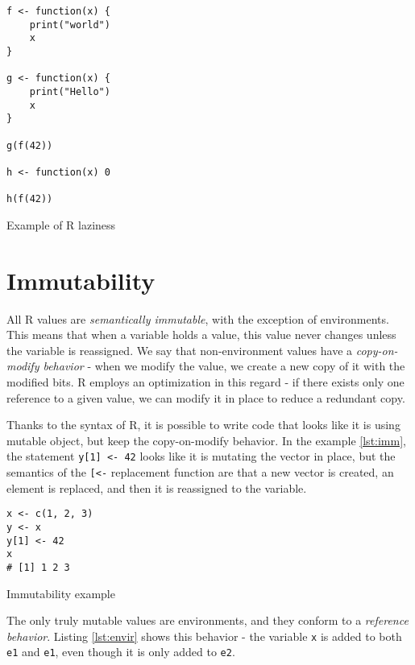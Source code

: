 \begin{listing}[h!]
	\centering
	\begin{verbatim}
f <- function(x) {
    print("world")
    x
}

g <- function(x) {
    print("Hello")
    x
}

g(f(42))

h <- function(x) 0

h(f(42))
  \end{verbatim}
	\caption{Example of R laziness}\label{lst:example-lazy}
\end{listing}

\section{Immutability}

All R values are \textit{semantically immutable}, with the exception of environments. This means that when a variable holds a value, this value never changes unless the variable is reassigned. We say that non-environment values have a \textit{copy-on-modify behavior} - when we modify the value, we create a new copy of it with the modified bits. R employs an optimization in this regard - if there exists only one reference to a given value, we can modify it in place to reduce a redundant copy.

Thanks to the syntax of R, it is possible to write code that looks like it is using mutable object, but keep the copy-on-modify behavior. In the example \ref{lst:imm}, the statement \texttt{y[1] <- 42} looks like it is mutating the vector in place, but the semantics of the \texttt{[<-} replacement function are that a new vector is created, an element is replaced, and then it is reassigned to the variable.

\begin{listing}[h!]
	\centering
	\begin{verbatim}
x <- c(1, 2, 3)
y <- x
y[1] <- 42
x
# [1] 1 2 3
  \end{verbatim}
  \caption{Immutability example}\label{lst:imm}
\end{listing}

The only truly mutable values are environments, and they conform to a \textit{reference behavior}. Listing \ref{lst:envir} shows this behavior - the variable \texttt{x} is added to both \texttt{e1} and \texttt{e1}, even though it is only added to \texttt{e2}.

